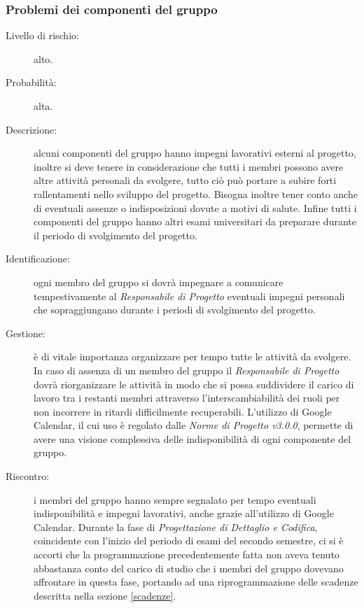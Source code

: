 \subsubsection{Problemi dei componenti del gruppo}
\begin{description}
	\item[Livello di rischio:] alto.
	\item[Probabilità:] alta.
	\item[Descrizione:] alcuni componenti del gruppo hanno impegni lavorativi esterni al progetto, inoltre si deve tenere in considerazione che tutti i membri possono avere altre attività personali da svolgere, tutto ciò può portare a subire forti rallentamenti nello sviluppo del progetto. Bisogna inoltre tener conto anche di eventuali assenze o indisposizioni dovute a motivi di salute. Infine tutti i componenti del gruppo hanno altri esami universitari da preparare durante il periodo di svolgimento del progetto.
	\item[Identificazione:] ogni membro del gruppo si dovrà impegnare a comunicare tempestivamente al \textit{Responsabile di Progetto} eventuali impegni personali che sopraggiungano durante i periodi di svolgimento del progetto. 
	\item[Gestione:] è di vitale importanza organizzare per tempo tutte le attività da svolgere. In caso di assenza di un membro del gruppo il \textit{Responsabile di Progetto} dovrà riorganizzare le attività in modo che si possa suddividere il carico di lavoro tra i restanti membri attraverso l'interscambiabilità dei ruoli per non incorrere in ritardi difficilmente recuperabili. L'utilizzo di \gls{Google Calendar}, il cui uso è regolato dalle \textit{Norme di Progetto v3.0.0}, permette di avere una visione complessiva delle indisponibilità di ogni componente del gruppo. 
	\item[Riscontro:] i membri del gruppo hanno sempre segnalato per tempo eventuali indisponibilità e impegni lavorativi, anche grazie all'utilizzo di \gls{Google Calendar}. Durante la fase di \textit{Progettazione di Dettaglio e Codifica}, coincidente con l'inizio del periodo di esami del secondo semestre, ci si è accorti che la programmazione precedentemente fatta non aveva tenuto abbastanza conto del carico di studio che i membri del gruppo dovevano affrontare in questa fase, portando ad una riprogrammazione delle scadenze descritta nella sezione \ref{scadenze}. 
\end{description}
